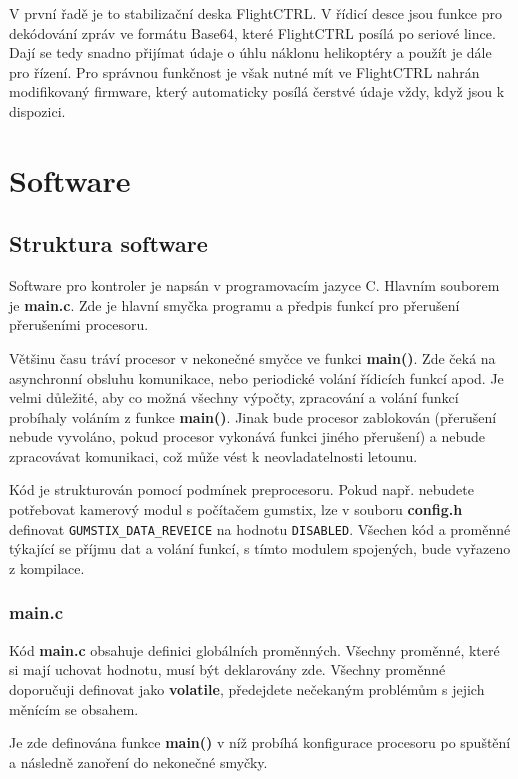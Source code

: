 \documentclass[11pt, a4paper]{article}
\begin{document}
V první řadě je to stabilizační deska FlightCTRL. V řídicí desce jsou funkce pro dekódování zpráv ve formátu Base64, které FlightCTRL posílá po seriové lince. Dají se tedy snadno přijímat údaje o úhlu náklonu helikoptéry a použít je dále pro řízení. Pro správnou funkčnost je však nutné mít ve FlightCTRL nahrán modifikovaný firmware, který automaticky posílá čerstvé údaje vždy, když jsou k dispozici.

\newpage

\section{Software}

\subsection{Struktura software}

Software pro kontroler je napsán v programovacím jazyce C. Hlavním souborem je \textbf{main.c}. Zde je hlavní smyčka programu a předpis funkcí pro přerušení přerušeními procesoru.

Většinu času tráví procesor v nekonečné smyčce ve funkci \textbf{main()}. Zde čeká na asynchronní obsluhu komunikace, nebo periodické volání řídicích funkcí apod. Je velmi důležité, aby co možná všechny výpočty, zpracování a volání funkcí probíhaly voláním z funkce \textbf{main()}. Jinak bude procesor zablokován (přerušení nebude vyvoláno, pokud procesor vykonává funkci jiného přerušení) a nebude zpracovávat komunikaci, což může vést k neovladatelnosti letounu.

Kód je strukturován pomocí podmínek preprocesoru. Pokud např. nebudete potřebovat kamerový modul s počítačem gumstix, lze v souboru \textbf{config.h} definovat \texttt{GUMSTIX\_DATA\_REVEICE} na hodnotu \texttt{DISABLED}. Všechen kód a proměnné týkající se příjmu dat a volání funkcí, s tímto modulem spojených, bude vyřazeno z kompilace.

\subsubsection{main.c}

Kód \textbf{main.c} obsahuje definici globálních proměnných. Všechny proměnné, které si mají uchovat hodnotu, musí být deklarovány zde. Všechny proměnné doporučuji definovat jako \textbf{volatile}, předejdete nečekaným problémům s jejich měnícím se obsahem.

Je zde definována funkce \textbf{main()} v níž probíhá konfigurace procesoru po spuštění a následně zanoření do nekonečné smyčky.
\end{document}
